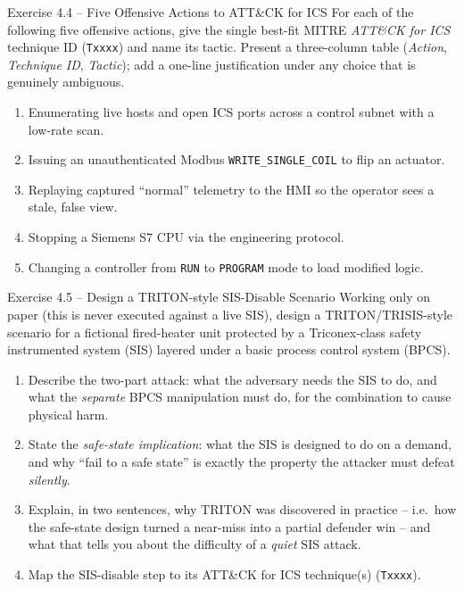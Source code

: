 \documentclass[11pt,a4paper]{article}
\begin{document}
\begin{taskbox}{Exercise 4.4 -- Five Offensive Actions to ATT\&CK for ICS}
For each of the following five offensive actions, give the single best-fit MITRE \emph{ATT\&CK for
ICS} technique ID (\texttt{Txxxx}) and name its tactic. Present a three-column table
(\emph{Action}, \emph{Technique ID}, \emph{Tactic}); add a one-line justification under any choice
that is genuinely ambiguous.
\begin{enumerate}\setlength{\itemsep}{0pt}
  \item Enumerating live hosts and open ICS ports across a control subnet with a low-rate scan.
  \item Issuing an unauthenticated Modbus \texttt{WRITE\_SINGLE\_COIL} to flip an actuator.
  \item Replaying captured ``normal'' telemetry to the HMI so the operator sees a stale, false view.
  \item Stopping a Siemens S7 CPU via the engineering protocol.
  \item Changing a controller from \texttt{RUN} to \texttt{PROGRAM} mode to load modified logic.
\end{enumerate}
\end{taskbox}

\begin{taskbox}{Exercise 4.5 -- Design a TRITON-style SIS-Disable Scenario}
Working only on paper (this is never executed against a live SIS), design a TRITON/TRISIS-style
scenario for a fictional fired-heater unit protected by a Triconex-class safety instrumented
system (SIS) layered under a basic process control system (BPCS).
\begin{enumerate}\setlength{\itemsep}{0pt}
  \item Describe the two-part attack: what the adversary needs the SIS to do, and what the
        \emph{separate} BPCS manipulation must do, for the combination to cause physical harm.
  \item State the \emph{safe-state implication}: what the SIS is designed to do on a demand, and
        why ``fail to a safe state'' is exactly the property the attacker must defeat \emph{silently}.
  \item Explain, in two sentences, why TRITON was discovered in practice -- i.e.\ how the safe-state
        design turned a near-miss into a partial defender win -- and what that tells you about the
        difficulty of a \emph{quiet} SIS attack.
  \item Map the SIS-disable step to its ATT\&CK for ICS technique(s) (\texttt{Txxxx}).
\end{enumerate}
\end{taskbox}
\end{document}
